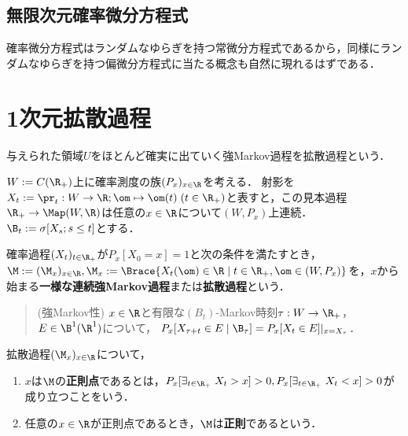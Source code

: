 \documentclass[uplatex,dvipdfmx]{jsreport}
\begin{document}
\subsection{無限次元確率微分方程式}

\begin{tcolorbox}[colframe=ForestGreen, colback=ForestGreen!10!white,breakable,colbacktitle=ForestGreen!40!white,coltitle=black,fonttitle=\bfseries\sffamily,
title=無限次元確率微分方程式]
    確率微分方程式はランダムなゆらぎを持つ常微分方程式であるから，同様にランダムなゆらぎを持つ偏微分方程式に当たる概念も自然に現れるはずである．
\end{tcolorbox}

\section{1次元拡散過程}

\begin{tcolorbox}[colframe=ForestGreen, colback=ForestGreen!10!white,breakable,colbacktitle=ForestGreen!40!white,coltitle=black,fonttitle=\bfseries\sffamily,
title=]
    与えられた領域$U$をほとんど確実に出ていく強Markov過程を拡散過程という．
\end{tcolorbox}

\begin{notation}
    $W:=C(\R_+)$上に確率測度の族$(P_x)_{x\in\R}$を考える．
    射影を$X_t:=\pr_t:W\to\R;\om\mapsto\om(t)\;(t\in\R_+)$と表すと，この見本過程$\R_+\to\Map(W,\R)$は任意の$x\in\R$について$(W,P_x)$上連続．
    $\B_t:=\sigma[X_s;s\le t]$とする．
\end{notation}

\begin{definition}
    確率過程$(X_t)_{t\in\R_+}$が$P_x[X_0=x]=1$と次の条件を満たすとき，$\M:=(\M_x)_{x\in\R},\M_x:=\Brace{X_t(\om)\in\R\mid t\in\R_+,\om\in(W,P_x)}$を，$x$から始まる\textbf{一様な連続強Markov過程}または\textbf{拡散過程}という．
    \begin{quote}
        (強Markov性) $x\in\R$と有限な$(B_t)$-Markov時刻$\tau:W\to\R_+$，$E\in\B^1(\R^1)$について，
        $P_x[X_{\tau+t}\in E\mid\B_\tau]=P_x[X_t\in E]|_{x=X_\tau}$．
    \end{quote}
\end{definition}

\begin{definition}
    拡散過程$(\M_x)_{x\in\R}$について，
    \begin{enumerate}
        \item $x$は$\M$の\textbf{正則点}であるとは，$P_x[\exists_{t\in\R_+}\;X_t>x]>0,P_x[\exists_{t\in\R_+}\;X_t<x]>0$が成り立つことをいう．
        \item 任意の$x\in\R$が正則点であるとき，$\M$は\textbf{正則}であるという．
    \end{enumerate}
\end{definition}
\end{document}
